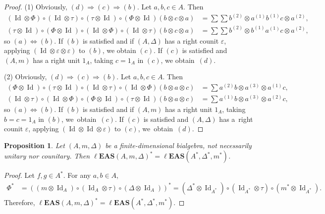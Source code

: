 \documentclass[10pt,a4paper]{amsart}
\numberwithin{equation}{section}
\newtheorem{Proposition}[Theorem]{Proposition}
 { \theoremstyle{definition}
\newtheorem{Definition}[Theorem]{Definition}
\newtheorem{Note}[Theorem]{Note}
\newtheorem{Example}[Theorem]{Example}
\newtheorem{Remark}[Theorem]{Remark}
\newtheorem{Notation}[Theorem]{Notation}}
\newcommand{\leas}{\ell\mathbf{EAS}}
\begin{document}
\begin{proof}
(1) Obviously, $(d)\Longrightarrow (c)\Longrightarrow (b)$. Let $a,b,c\in A$. Then
\begin{align*}
(\operatorname{Id} \otimes \Phi)\circ (\operatorname{Id} \otimes \tau)\circ (\tau \otimes \operatorname{Id})\circ (\Phi\otimes \operatorname{Id})(b\otimes c\otimes a)&=\sum \sum b^{(2)}\otimes a^{(1)}b^{(1)}c\otimes a^{(2)},\\
(\tau \otimes \operatorname{Id})\circ (\Phi\otimes \operatorname{Id})\circ (\operatorname{Id} \otimes \Phi)\circ (\operatorname{Id} \otimes \tau)(b\otimes c\otimes a)&=\sum \sum b^{(2)}\otimes b^{(1)}a^{(1)}c\otimes a^{(2)},
\end{align*}
so $(a)\Longleftrightarrow (b)$. If $(b)$ is satisfied and if $(A,\Delta)$ has a right counit $\varepsilon$, applying $(\operatorname{Id} \otimes \varepsilon \otimes \varepsilon)$ to $(b)$, we obtain $(c)$.
If $(c)$ is satisfied and $(A,m)$ has a right unit $1_A$, taking $c=1_A$ in $(c)$, we obtain~$(d)$.

(2) Obviously, $(d)\Longrightarrow (c)\Longrightarrow (b)$. Let $a,b,c\in A$. Then
\begin{align*}
(\Phi\otimes \operatorname{Id})\circ (\tau \otimes \operatorname{Id})\circ (\operatorname{Id} \otimes \tau)\circ (\operatorname{Id} \otimes \Phi)(b\otimes a\otimes c)&=\sum a^{(2)}b\otimes a^{(3)}\otimes a^{(1)}c,\\
(\operatorname{Id} \otimes \tau)\circ (\operatorname{Id} \otimes \Phi)\circ (\Phi\otimes \operatorname{Id})\circ (\tau \otimes \operatorname{Id})(b\otimes a\otimes c)&=\sum a^{(1)}b\otimes a^{(3)}\otimes a^{(2)}c,
\end{align*}
so $(a)\Longleftrightarrow (b)$. If $(b)$ is satisfied and if $(A,m)$ has a right unit $1_A$, taking $b=c=1_A$ in $(b)$, we~obtain~$(c)$. If $(c)$ is satisfied
and $(A,\Delta)$ has a~right counit $\varepsilon$, applying $(\operatorname{Id} \otimes \operatorname{Id} \otimes \varepsilon)$ to $(c)$, we~obtain~$(d)$. \end{proof}

\begin{Proposition}
Let $(A,m,\Delta)$ be a finite-dimensional bialgebra, not necessarily unitary nor counitary. Then $\leas(A,m,\Delta)^*=\leas(A^*,\Delta^*,m^*)$.
\end{Proposition}

\begin{proof}
Let $f,g\in A^*$. For any $a,b\in A$,
\begin{align*}
\Phi^*&=((m\otimes \operatorname{Id}_A)\circ (\operatorname{Id}_A\otimes \tau)\circ (\Delta\otimes \operatorname{Id}_A) )^*=(\Delta^*\otimes \operatorname{Id}_{A^*})\circ (\operatorname{Id}_{A^*}\otimes \tau)\circ (m^*\otimes \operatorname{Id}_{A^*}).
\end{align*}
Therefore, $\leas(A,m,\Delta)^*=\leas(A^*,\Delta^*,m^*)$. \end{proof}
\end{document}
